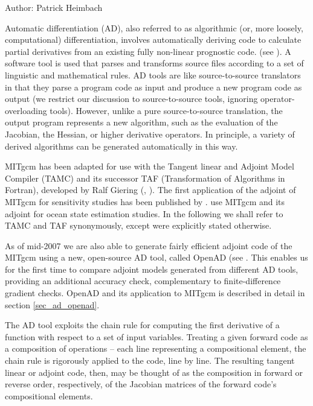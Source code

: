 
Author: Patrick Heimbach
\label{ask_the_author:doc_ad_2}

{\sf Automatic differentiation} (AD), also referred to as algorithmic
(or, more loosely, computational) differentiation, involves
automatically deriving code to calculate partial derivatives from an
existing fully non-linear prognostic code.  (see \cite{gri:00}).  A
software tool is used that parses and transforms source files
according to a set of linguistic and mathematical rules.  AD tools are
like source-to-source translators in that they parse a program code as
input and produce a new program code as output
(we restrict our discussion to source-to-source tools, ignoring
operator-overloading tools).  However, unlike a
pure source-to-source translation, the output program represents a new
algorithm, such as the evaluation of the Jacobian, the Hessian, or
higher derivative operators.  In principle, a variety of derived
algorithms can be generated automatically in this way.

MITgcm has been adapted for use with the Tangent linear and Adjoint
Model Compiler (TAMC) and its successor TAF (Transformation of
Algorithms in Fortran), developed by Ralf Giering (\cite{gie-kam:98},
\cite{gie:99,gie:00}).  The first application of the adjoint of MITgcm
for sensitivity studies has been published by \cite{maro-eta:99}.
\cite{stam-etal:97,stam-etal:02} use MITgcm and its adjoint for ocean
state estimation studies.  In the following we shall refer to TAMC and
TAF synonymously, except were explicitly stated otherwise.

As of mid-2007 we are also able to generate fairly efficient
adjoint code of the MITgcm using a new, open-source AD tool,
called OpenAD (see \cite{naum-etal:06,utke-etal:08}.
This enables us for the first time to compare adjoint models
generated from different AD tools, providing an additional
accuracy check, complementary to finite-difference gradient checks.
OpenAD and its application to  MITgcm is described in detail
in section \ref{sec_ad_openad}.

The AD tool exploits the chain rule for computing the first derivative of a
function with respect to a set of input variables.  Treating a given
forward code as a composition of operations -- each line representing
a compositional element, the chain rule is rigorously applied to the
code, line by line. The resulting tangent linear or adjoint code,
then, may be thought of as the composition in forward or reverse
order, respectively, of the Jacobian matrices of the forward code's
compositional elements.

